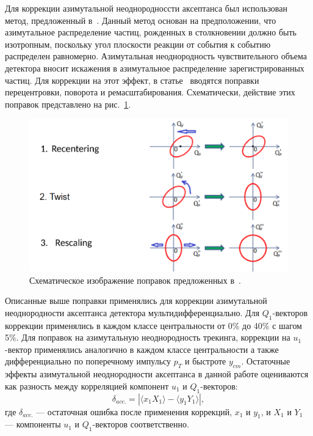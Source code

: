 Для коррекции азимутальной неоднородноссти аксептанса был использован метод, предложенный в~\cite{Selyuzhenkov:2007zi}.
Данный метод основан на предположении, что азимутальное распределение частиц, рожденных в столкновении должно быть изотропным, поскольку угол плоскости реакции от события к событию распределен равномерно.
Азимутальная неоднородность чувствительного объема детектора вносит искажения в азимутальное распределение зарегистрированных частиц. 
Для коррекции на этот эффект, в статье~\cite{Selyuzhenkov:2007zi} вводятся поправки перецентровки, поворота и ремасштабирования. 
Схематически, действие этих поправок представлено на рис.~\ref{fig:qn_corrections}.
%
\begin{figure}[ht]
\begin{center}
\includegraphics[width=0.75\linewidth]{images/qntools_corrections.png}
\caption{Схематическое изображение поправок предложенных в~\cite{Selyuzhenkov:2007zi}.}
\label{fig:qn_corrections}
\end{center}
\end{figure}
%

Описанные выше поправки применялись для коррекции азимутальной неоднородности аксептанса детектора мультидифференциально.
Для $Q_1$-векторов коррекции применялись в каждом классе центральности от 0\% до 40\% с шагом 5\%.
Для поправок на азимутальную неоднородность трекинга, коррекции на $u_1$-вектор применялись аналогично в каждом классе центральности а также дифференциально по поперечному импульсу $p_T$ и быстроте $y_{cm}$. 
Остаточные эффекты азимутальной неоднородности аксептанса в данной работе оцениваются как разность между корреляцией компонент $u_1$ и $Q_1$-векторов:
\begin{equation}
    \delta_{acc.} = | \langle x_1 X_1 \rangle - \langle y_1 Y_1 \rangle |,
\end{equation}
где $\delta_{acc.}$ --- остаточная ошибка после применения коррекций, $x_1$ и $y_1$, и $X_1$ и $Y_1$ --- компоненты $u_1$ и $Q_1$-векторов соответственно. 

